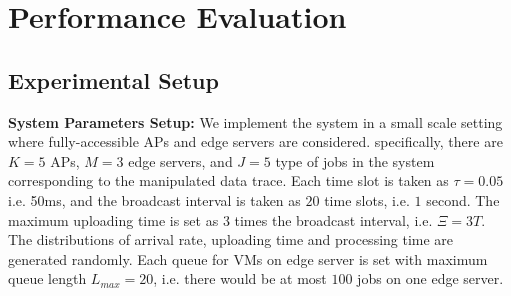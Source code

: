 \section{Performance Evaluation}
\label{sec:evaluation}

\subsection{Experimental Setup}
\textbf{System Parameters Setup:}
We implement the system in a small scale setting where fully-accessible APs and edge servers are considered.
specifically, there are $K=5$ APs, $M=3$ edge servers, and $J=5$ type of jobs in the system corresponding to the manipulated data trace.
Each time slot is taken as $\tau = 0.05$ i.e. 50ms, and the broadcast interval is taken as $20$ time slots, i.e. $1$ second.
The maximum uploading time is set as $3$ times the broadcast interval, i.e. $\Xi = 3T$.
The distributions of arrival rate, uploading time and processing time are generated randomly.
Each queue for VMs on edge server is set with maximum queue length $L_{max}=20$, i.e. there would be at most $100$ jobs on one edge server.

